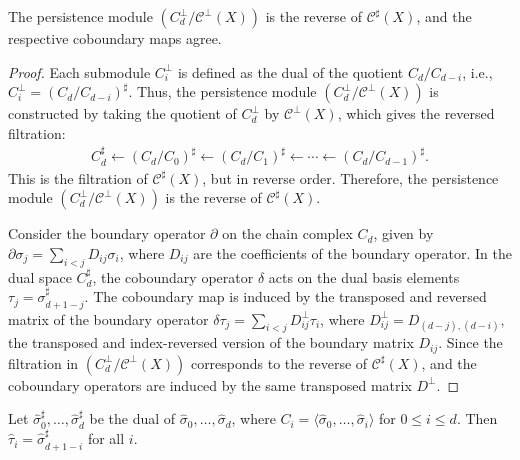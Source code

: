 \begin{proposition}{\cite[Proposition 2.8]{de2011dualities}}
The persistence module $(C_d^\perp/\mathcal{C}^\perp(X))$ is the reverse of $\mathcal{C}^\sharp(X)$, and the respective coboundary maps agree.
\end{proposition}

\begin{proof}
Each submodule \( C_i^\perp \) is defined as the dual of the quotient \( C_d / C_{d-i} \), i.e., $C_i^\perp = (C_d / C_{d-i})^\sharp$. Thus, the persistence module \( (C_d^\perp / \mathcal{C}^\perp(X)) \) is constructed by taking the quotient of \( C_d^\perp \) by \( \mathcal{C}^\perp(X) \), which gives the reversed filtration:
\begin{align}
C_d^\sharp \leftarrow (C_d / C_0)^\sharp \leftarrow (C_d / C_1)^\sharp \leftarrow \cdots \leftarrow (C_d / C_{d-1})^\sharp.
\end{align}
This is the filtration of \( \mathcal{C}^\sharp(X) \), but in reverse order. Therefore, the persistence module \( (C_d^\perp / \mathcal{C}^\perp(X)) \) is the reverse of \( \mathcal{C}^\sharp(X) \).

Consider the boundary operator \( \partial \) on the chain complex \( C_d \), given by $\partial \sigma_j = \sum_{i < j} D_{ij} \sigma_i$, where \( D_{ij} \) are the coefficients of the boundary operator. In the dual space \( C_d^\sharp \), the coboundary operator \( \delta \) acts on the dual basis elements \( \tau_j = \sigma^\sharp_{d+1-j} \). The coboundary map is induced by the transposed and reversed matrix of the boundary operator $\delta \tau_j = \sum_{i < j} D_{ij}^\perp \tau_i$, where \( D_{ij}^\perp = D_{(d-j),(d-i)} \), the transposed and index-reversed version of the boundary matrix \( D_{ij} \). Since the filtration in \( (C_d^\perp / \mathcal{C}^\perp(X)) \) corresponds to the reverse of \( \mathcal{C}^\sharp(X) \), and the coboundary operators are induced by the same transposed matrix \( D^\perp \).
\end{proof}

\begin{corollary}{\cite[Proposition 2.10]{de2011dualities}}
Let \( \hat{\sigma}_0^\sharp, \ldots, \hat{\sigma}_d^\sharp \) be the dual of \( \hat{\sigma}_0, \ldots, \hat{\sigma}_d \), where $C_i = \langle \hat{\sigma}_0, \ldots, \hat{\sigma}_i \rangle$ for $0 \leq i \leq d$. Then \( \hat{\tau}_i = \hat{\sigma}_{d+1-i}^\sharp \) for all \( i \).
\end{corollary}


